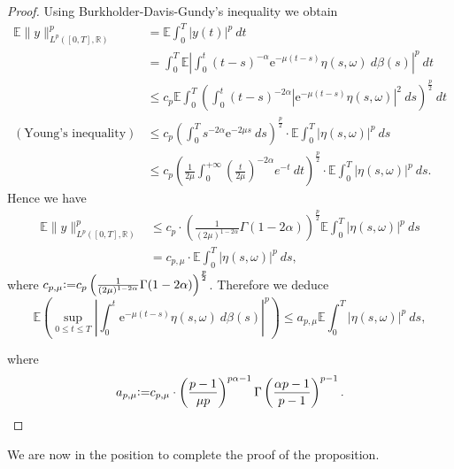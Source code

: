 \documentclass[11pt,reqno,draft]{amsart}
\begin{document}
\begin{proof}
\noindent Using Burkholder-Davis-Gundy's inequality we obtain
\begin{equation*}
\begin{split}
{\mathbb E}\|y\|_{L^p([0,T],{\mathbb R})}^p&={\mathbb E}\int_0^T|y(t)|^p\:dt\\
&=\int_0^T{\mathbb E}|\int_0^t(t-s)^{-\alpha}{\mathrm{e}}^{-\mu(t-s)}\eta(s,\omega)\:d\beta(s)|^p\:dt\\
&\leq
c_p{\mathbb E}\int_0^T\left(\int_0^t(t-s)^{-2\alpha}|{\mathrm{e}}^{-\mu(t-s)}\eta(s,\omega)|^2\:ds\right)^{\frac
p2}\:dt\\
(\mbox{Young's inequality} )&\leq
c_p\left(\int_0^Ts^{-2\alpha}{\mathrm{e}}^{-2\mu s}\:ds\right)^{\frac
p2}\cdot {\mathbb E}\int_0^T|\eta(s,\omega)|^p\:ds\\
&\leq c_p \left(\frac{1}{2\mu}
\int_0^{+\infty}\left(\frac{t}{2\mu}\right)^{-2\alpha}e^{-t}\:dt\right)^{\frac
p2}\cdot{\mathbb E}\int_0^T|\eta(s,\omega)|^p\:ds.
\end{split}
\end{equation*}
Hence we have
\begin{equation*}
\begin{split} {\mathbb E}\|y\|^p_{L^p([0,T],{\mathbb R})}&\leq
c_p\cdot\left(\frac{1}{(2\mu)^{1-2\alpha}}\Gamma(1-2\alpha)\right)^{\frac p2}{\mathbb E}\int_0^T|\eta(s,\omega)|^p\:ds\\
&= c_{p,\mu}\cdot {\mathbb E}\int_0^T|\eta(s,\omega)|^p\:ds,
\end{split}
\end{equation*}
where $c_{p,\mu}{\mathrel{\mathrm{\raise0.1ex\hbox{:}\hbox{=}\strut}}} c_p
\left(\frac{1}{(2\mu)^{1-2\alpha}}\Gamma(1-2\alpha)\right)^{\frac
p2} $. Therefore we deduce
\begin{equation*}
{\mathbb E}\left(\sup\limits_{0\leq t\leq
T}\left|\int_0^t{\mathrm{e}}^{-\mu(t-s)}\eta(s,\omega)\:d\beta(s)\right|^p\right)\leq
a_{p,\mu}{\mathbb E}\int_0^T|\eta(s,\omega)|^p\:ds,
\end{equation*}

\noindent where $$ a_{p,\mu}{\mathrel{\mathrm{\raise0.1ex\hbox{:}\hbox{=}\strut}}} c_{p,\mu}\cdot
\left(\frac{p-1}{\mu p}\right)^{p\alpha-1}\Gamma \left( \frac{\alpha
p-1}{p-1}\right)^{p-1}.$$
\end{proof}
\noindent We are now in the position to complete the proof of the
proposition.
\end{document}
